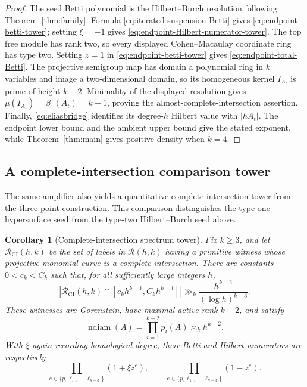 \documentclass[11pt,reqno]{amsart}
\newtheorem{corollary}[theorem]{Corollary}
\theoremstyle{definition}
\theoremstyle{remark}
\newcommand{\Rcal}{\mathcal R}
\newcommand{\ndiam}{\operatorname{ndiam}}
\begin{document}
\begin{proof}
The seed Betti polynomial is the Hilbert--Burch resolution following
Theorem~\ref{thm:family}.  Formula
\eqref{eq:iterated-suspension-Betti} gives
\eqref{eq:endpoint-betti-tower}; setting $\xi=-1$ gives
\eqref{eq:endpoint-Hilbert-numerator-tower}.  The top free module has rank
two, so every displayed Cohen--Macaulay coordinate ring has type two.
Setting $z=1$ in \eqref{eq:endpoint-betti-tower} gives
\eqref{eq:endpoint-total-Betti}.  The projective semigroup map has domain a
polynomial ring in $k$ variables and image a two-dimensional domain, so its
homogeneous kernel $I_{A_t}$ is prime of height $k-2$.  Minimality of the
displayed resolution gives
$\mu(I_{A_t})=\beta_1(A_t)=k-1$, proving the almost-complete-intersection
assertion.
Finally, \eqref{eq:eliasbridge} identifies its degree-$h$ Hilbert value with
$|hA_t|$.  The endpoint lower bound and the ambient upper bound give the
stated exponent, while Theorem~\ref{thm:main} gives positive density when
$k=4$.
\end{proof}

\subsection{A complete-intersection comparison tower}

The same amplifier also yields a quantitative complete-intersection tower
from the three-point construction.  This comparison distinguishes the
type-one hypersurface seed from the type-two Hilbert--Burch seed above.

\begin{corollary}[Complete-intersection spectrum tower]
\label{cor:complete-intersection-spectrum-tower}
Fix $k\geq3$, and let $\Rcal_{\mathrm{CI}}(h,k)$ be the set of labels in
$\Rcal(h,k)$ having a primitive witness whose projective monomial curve is a
complete intersection.  There are constants $0<c_k<C_k$ such that, for all
sufficiently large integers $h$,
\begin{equation}\label{eq:complete-intersection-spectrum-tower}
 \left|\Rcal_{\mathrm{CI}}(h,k)
 \cap[c_kh^{k-1},C_kh^{k-1}]\right|
 \gg_k \frac{h^{k-2}}{(\log h)^{k-3}}.
\end{equation}
These witnesses are Gorenstein, have maximal active rank $k-2$, and satisfy
\begin{equation}\label{eq:complete-intersection-critical-core}
 \ndiam(A)=\prod_{i=1}^{k-2}p_i(A)\asymp_k h^{k-2}.
\end{equation}
With $\xi$ again recording homological degree, their Betti and Hilbert
numerators are respectively
\begin{equation}\label{eq:complete-intersection-tower-Betti}
 \prod_{e\in\{p,\ell_1,\ldots,\ell_{k-3}\}}(1+\xi z^e),
 \qquad
 \prod_{e\in\{p,\ell_1,\ldots,\ell_{k-3}\}}(1-z^e).
\end{equation}
\end{corollary}
\end{document}
